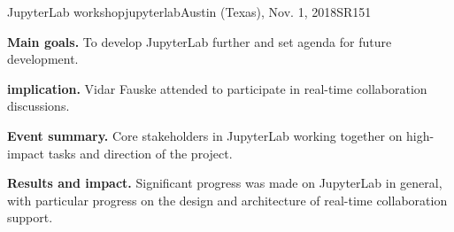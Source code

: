 \begin{event}{JupyterLab workshop}{jupyterlab}{Austin (Texas), Nov. 1, 2018}{SR}{15}{1}{}

\textbf{Main goals.} To develop JupyterLab further and set agenda for future development.

\textbf{\ODK implication.} Vidar Fauske attended to participate in real-time collaboration discussions.

\textbf{Event summary.} Core stakeholders in JupyterLab working together on high-impact tasks and direction of the project.

\textbf{Results and impact.} Significant progress was made on JupyterLab in general, with particular progress on the design and architecture of real-time collaboration support.

\end{event}
